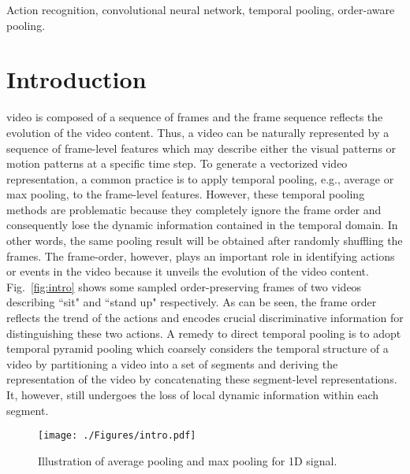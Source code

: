 \documentclass[journal]{IEEEtran}
\begin{document}
\begin{IEEEkeywords}
Action recognition, convolutional neural network, temporal pooling, order-aware pooling.
\end{IEEEkeywords}






\IEEEpeerreviewmaketitle


\tableofcontents




\section{Introduction}



 video is composed of a sequence of frames and the frame sequence reflects the evolution of the video content. Thus, a video can be naturally represented by a sequence of frame-level features which may describe either the visual patterns or motion patterns at a specific time step. To generate a vectorized video representation, a common practice is to apply temporal pooling, e.g., average or max pooling, to the frame-level features. However, these temporal pooling methods are problematic because they completely ignore the frame order and consequently lose the dynamic information contained in the temporal domain. In other words, the same pooling result will be obtained after randomly shuffling the frames. The frame-order, however, plays an important role in identifying actions or events in the video because it unveils the evolution of the video content. Fig.~\ref{fig:intro} shows some sampled order-preserving frames of two videos describing ``sit" and ``stand up" respectively. As can be seen, the frame order reflects the trend of the actions and encodes crucial discriminative information for distinguishing these two actions. A remedy to direct temporal pooling is to adopt temporal pyramid pooling which coarsely considers the temporal structure of a video by partitioning a video into a set of segments and deriving the representation of the video by concatenating these segment-level representations. It, however, still undergoes the loss of local dynamic information within each segment.

\begin{figure}[t]
\begin{center}
\captionsetup{justification=centering}
\texttt{[image: ./Figures/intro.pdf]}
\end{center}
   \caption{Illustration of average pooling and max pooling for 1D signal.}
\label{fig:intro0}
\end{figure}
\end{document}

